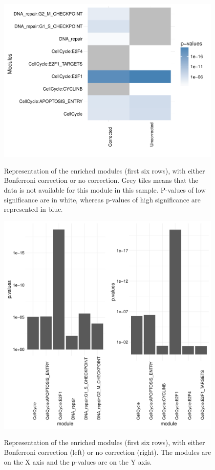 \documentclass{article}
\begin{document}
\begin{figure}[h!]
	\centering
    \caption{Representation of the enriched modules (first six rows), with
    either Bonferroni correction or no correction. Grey tiles means that the
    data is not available for this module in this sample. P-values of low
    significance are in white, whereas p-values of high significance are
    represented in blue.}
    \includegraphics[width=\textwidth]{figures/comparison_corrected_unc.pdf}
    \label{fig:heatm}

\end{figure}


\begin{figure}[h!]
	\centering
	\caption{Representation of the enriched modules (first six rows), with either Bonferroni correction (left) or no correction (right). The modules are on the X axis and the p-values are on the Y axis.  }
	\includegraphics[width=\textwidth]{figures/comparison_corrected_unc_bars.pdf}
	\label{fig:barp}

\end{figure}
\end{document}
